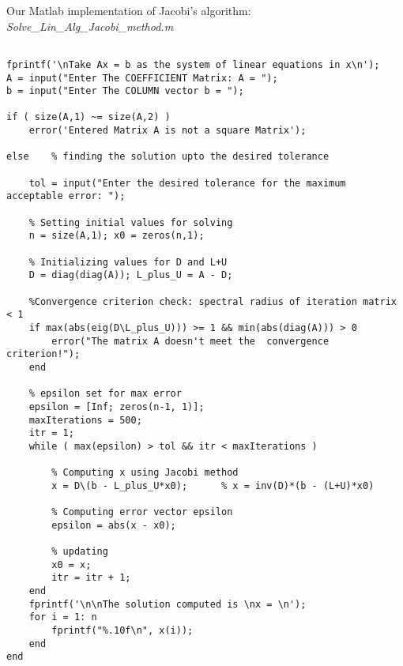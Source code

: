 \documentclass[simulation]{subfiles}
\begin{document}
Our Matlab implementation of Jacobi's algorithm: \textit{Solve\_Lin\_Alg\_Jacobi\_method.m}\\

{\footnotesize
\begin{verbatim}    
    
fprintf('\nTake Ax = b as the system of linear equations in x\n');
A = input("Enter The COEFFICIENT Matrix: A = ");
b = input("Enter The COLUMN vector b = ");

if ( size(A,1) ~= size(A,2) ) 
    error('Entered Matrix A is not a square Matrix');

else    % finding the solution upto the desired tolerance 
    
    tol = input("Enter the desired tolerance for the maximum acceptable error: ");
    
    % Setting initial values for solving
    n = size(A,1); x0 = zeros(n,1);        

    % Initializing values for D and L+U
    D = diag(diag(A)); L_plus_U = A - D;  

    %Convergence criterion check: spectral radius of iteration matrix < 1
    if max(abs(eig(D\L_plus_U))) >= 1 && min(abs(diag(A))) > 0              
        error("The matrix A doesn't meet the  convergence criterion!");
    end

    % epsilon set for max error
    epsilon = [Inf; zeros(n-1, 1)];
    maxIterations = 500;
    itr = 1;
    while ( max(epsilon) > tol && itr < maxIterations )

        % Computing x using Jacobi method
        x = D\(b - L_plus_U*x0);      % x = inv(D)*(b - (L+U)*x0)
        
        % Computing error vector epsilon
        epsilon = abs(x - x0);

        % updating
        x0 = x;
        itr = itr + 1;
    end
    fprintf('\n\nThe solution computed is \nx = \n');
    for i = 1: n
        fprintf("%.10f\n", x(i));
    end    
end
    \end{verbatim}
}

\clearpage
\end{document}
